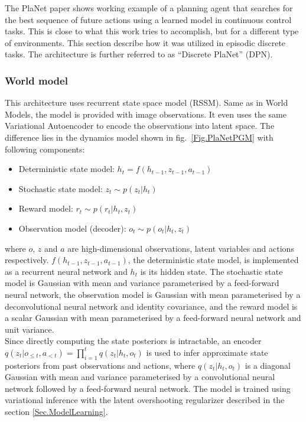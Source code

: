 The PlaNet paper \cite{Algo.PlaNet} shows working example of a planning agent that searches for the best sequence of future actions using a learned model in continuous control tasks. This is close to what this work tries to accomplish, but for a different type of environments. This section describe how it was utilized in episodic discrete tasks. The architecture is further referred to as ``Discrete PlaNet'' (DPN).

\subsubsection{World model}

This architecture uses recurrent state space model (RSSM). Same as in World Models, the model is provided with image observations. It even uses the same Variational Autoencoder to encode the observations into latent space. The difference lies in the dynamics model shown in fig.~\ref{Fig.PlaNetPGM} with following components:
\begin{itemize}
\item Deterministic state model:             $h_t = f(h_{t-1}, z_{t-1}, a_{t-1})$
\item Stochastic state model:                $z_t \sim p(z_t|h_t)$
\item Reward model:                          $r_t \sim p(r_t|h_t, z_t)$
\item Observation model (decoder):           $o_t \sim p(o_t|h_t, z_t)$
\end{itemize}
where $o$, $z$ and $a$ are high-dimensional observations, latent variables and actions respectively. $f(h_{t-1}, z_{t-1}, a_{t-1})$, the deterministic state model, is implemented as a recurrent neural network and $h_t$ is its hidden state. The stochastic state model is Gaussian with mean and variance parameterised by a feed-forward neural network, the observation model is Gaussian with mean parameterised by a deconvolutional neural network and identity covariance, and the reward model is a scalar Gaussian with mean parameterised by a feed-forward neural network and unit variance. \\
Since directly computing the state posteriors is intractable, an encoder $q(z_t|o_{\leqslant t}, a_{< t}) = \prod_{i=1}^tq(z_t|h_t,o_t)$ is used to infer approximate state posteriors from past observations and actions, where $q(z_t | h_t, o_t)$ is a diagonal Gaussian with mean and variance parameterised by a convolutional neural network followed by a feed-forward neural network. The model is trained using variational inference with the latent overshooting regularizer described in the section \ref{Sec.ModelLearning}.

